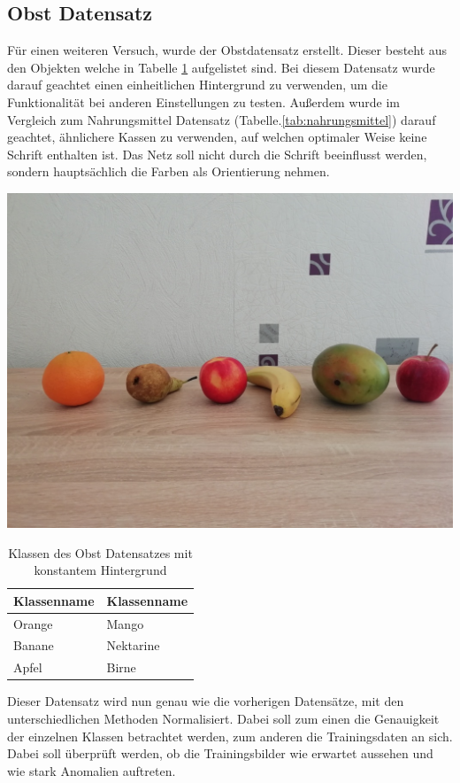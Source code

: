 \documentclass[a4paper,12pt,oneside]{article}
\begin{document}
\subsection{Obst Datensatz}
Für einen weiteren Versuch, wurde der Obstdatensatz erstellt. Dieser besteht aus den Objekten welche in Tabelle \ref{tab:obst} aufgelistet sind. Bei diesem Datensatz wurde darauf geachtet einen einheitlichen Hintergrund zu verwenden, um die Funktionalität bei anderen Einstellungen zu testen. Außerdem wurde im Vergleich zum Nahrungsmittel Datensatz (Tabelle.\ref{tab:nahrungsmittel}) darauf geachtet, ähnlichere Kassen zu verwenden, auf welchen optimaler Weise keine Schrift enthalten ist. Das Netz soll nicht durch die Schrift beeinflusst werden, sondern hauptsächlich die Farben als Orientierung nehmen.
\begin{table}[htpb]
\caption{Klassen des Obst Datensatzes mit konstantem Hintergrund}
\begin{minipage}[r]{.5\textwidth} 
\includegraphics[width=.7\textwidth]{Sources/Obst_mit_hintergrund}  
\end{minipage} 
\hfill
\begin{minipage}[c]{.5\textwidth}\label{tab:obst} 
\centering  
\begin{tabular}{|l|l|}
\hline
Klassenname & Klassenname\\
\hline
Orange & Mango\\
Banane & Nektarine\\
Apfel & Birne\\
\hline
\end{tabular} 
\end{minipage}
\end{table}  
Dieser Datensatz wird nun genau wie die vorherigen Datensätze, mit den unterschiedlichen Methoden Normalisiert. Dabei soll zum einen die Genauigkeit der einzelnen Klassen betrachtet werden, zum anderen die Trainingsdaten an sich. Dabei soll überprüft werden, ob die Trainingsbilder wie erwartet aussehen und wie stark Anomalien auftreten. 
\end{document}
